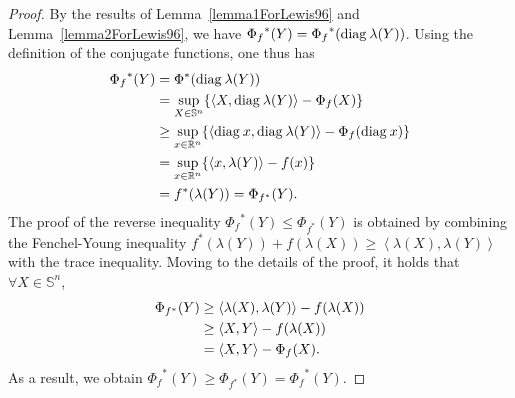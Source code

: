 \documentclass[a4paper,11pt, oneside]{book}
\theoremstyle{definition}
\newcommand{\NDemenstionalRealEuclideanSpace}{\mathbb{R}^n}
\newcommand{\NDemenstionalRealSymmetricMatrixSpace}{\mathbb{S}^n}
\newcommand{\Diagnosis}[1]{\text{\rm diag\:${#1}$}} %
\newcommand{\InnerProduct}[2]{\left\langle {#1},{#2}\right\rangle} %
\newcommand{\ConjugateFunction}[1]{{#1}^*}
\begin{document}
\begin{proof}
  By the results of Lemma~\ref{lemma1ForLewis96} and Lemma~\ref{lemma2ForLewis96}, we have $\ConjugateFunction{\Phi_f}(Y) = \ConjugateFunction{\Phi_f}(\Diagnosis{\lambda (Y)})$. Using the definition of the conjugate functions, one thus has
  \begin{equation}
    \begin{split}
      \ConjugateFunction{\Phi_f}(Y) &= \ConjugateFunction{\Phi}(\Diagnosis{\lambda (Y)})\\
      &= \sup_{X \in \NDemenstionalRealSymmetricMatrixSpace} \{\InnerProduct{X}{\Diagnosis{\lambda (Y)}} - \Phi_f(X)\}\\
      &\geq \sup_{x \in \NDemenstionalRealEuclideanSpace} \{\InnerProduct{\Diagnosis{x}}{\Diagnosis{\lambda (Y)}} - \Phi_f(\Diagnosis{x})\}\\
      &= \sup_{x \in \NDemenstionalRealEuclideanSpace} \{\InnerProduct{x}{\lambda (Y)} - f(x)\}\\
      &= \ConjugateFunction{f}(\lambda (Y)) = \Phi_{\ConjugateFunction{f}}(Y). \notag
    \end{split}
  \end{equation}
  The proof of the reverse inequality $\ConjugateFunction{\Phi_f}(Y) \leq \Phi_{\ConjugateFunction{f}}(Y)$ is obtained by combining the Fenchel-Young inequality $\ConjugateFunction{f}(\lambda(Y)) + f(\lambda(X)) \geq \InnerProduct{\lambda(X)}{\lambda(Y)}$ with the trace inequality. Moving to the details of the proof, it holds that $\forall X \in \NDemenstionalRealSymmetricMatrixSpace$,
  \begin{equation}
    \begin{split}
      \Phi_{\ConjugateFunction{f}}(Y) &\geq \InnerProduct{\lambda(X)}{\lambda(Y)} - f(\lambda(X))\\
      &\geq \InnerProduct{X}{Y} - f(\lambda(X))\\
      &= \InnerProduct{X}{Y} - \Phi_f(X). \notag
    \end{split}
  \end{equation}
  As a result, we obtain $\ConjugateFunction{\Phi_f}(Y) \geq \Phi_{\ConjugateFunction{f}}(Y) = \ConjugateFunction{\Phi_f}(Y)$.
\end{proof}
\end{document}
